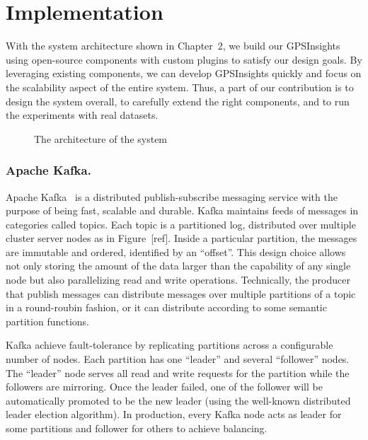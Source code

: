 \documentclass{acm_proc_article-sp}
\begin{document}
\section{Implementation} 

With the system architecture shown in Chapter~2, we build our GPSInsights using open-source components with custom plugins to satisfy our design goals. By leveraging existing components, we can develop GPSInsights quickly and focus on the scalability aspect of the entire system. Thus, a part of our contribution is to design the system overall, to carefully extend the right components, and to run the experiments with real datasets.  

\begin{figure}[h]
\centering
{}
\caption{The architecture of the system}
\end{figure}

\subsubsection{Apache Kafka.} 

Apache Kafka~\cite{kafkapaper,kafkaweb} is a distributed publish-subscribe messaging service with the purpose of being fast, scalable and durable. Kafka maintains feeds of messages in categories called topics. Each topic is a partitioned log, distributed over multiple cluster server nodes as in Figure~[ref]. Inside a particular partition, the messages are immutable and ordered, identified by an ``offset''. This design choice allows not only storing the amount of the data larger than the capability of any single node but also parallelizing read and write operations. Technically, the producer that publish messages can distribute messages over multiple partitions of a topic in a round-roubin fashion, or it can distribute according to some semantic partition functions.

Kafka achieve fault-tolerance by replicating partitions across a configurable number of nodes. Each partition has one ``leader'' and several ``follower'' nodes. The ``leader'' node serves all read and write requests for the partition while the followers are mirroring. Once the leader failed, one of the follower will be automatically promoted to be the new leader (using the well-known distributed leader election algorithm). In production, every Kafka node acts as leader for some partitions and follower for others to achieve balancing. 
\end{document}
